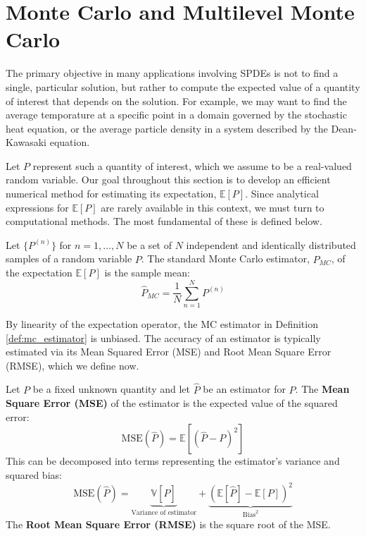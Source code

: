 \section{Monte Carlo and Multilevel Monte Carlo}\label{sec:intro_mlmc}

The primary objective in many applications involving SPDEs is not to find 
a single, particular solution, but rather to compute the expected value of a quantity of 
interest that depends on the solution. For example, we may 
want to find the average temporature at a specific point in a domain 
governed by the stochastic heat equation, or the average particle density in a
system described by the Dean-Kawasaki equation.

Let $P$ represent such a quantity of interest, which we assume to be a real-valued 
random variable. Our goal throughout this section is to develop an efficient numerical
method for estimating its expectation, $\mathbb{E}[P]$. Since 
analytical expressions for $\mathbb{E}[P]$ are rarely available in this context, we must 
turn to computational methods. The most fundamental of these is defined below.

\begin{definition}\label{def:mc_estimator}
    Let $\{P^{(n)}\}$ for $n = 1, \dots, N$ be a set of $N$ independent and identically
    distributed samples of a random variable $P$. The standard Monte Carlo estimator,
    $\hat{P}_{MC}$, of the expectation $\mathbb{E}[P]$ is the sample mean:
    \[
    \hat{P}_{MC} = \frac{1}{N} \sum_{n=1}^N P^{(n)}
    \]
\end{definition}

By linearity of the expectation operator, the MC estimator in Definition \ref{def:mc_estimator} 
is unbiased. The accuracy of an estimator is typically estimated via its Mean Squared Error (MSE) and 
Root Mean Square Error (RMSE), which we define now.

\begin{definition}\label{def:mse_rmse}
    Let $P$ be a fixed unknown quantity and let $\hat{P}$ be an estimator for $P$. 
    The \textbf{Mean Square Error (MSE)} of the estimator is the expected value of 
    the squared error:
    \[
    \text{MSE}(\hat{P}) = \mathbb{E}[(\hat{P} - P)^2]
    \]
    This can be decomposed into terms representing the estimator's variance and squared bias:
    \[
    \text{MSE}(\hat{P}) = \underbrace{\mathbb{V}[\hat{P}]}_{\text{Variance of estimator}}
    + \underbrace{(\mathbb{E}[\hat{P}] - \mathbb{E}[P])^2}_{\text{Bias}^2}
    \]
    The \textbf{Root Mean Square Error (RMSE)} is the square root of the MSE.
\end{definition}

